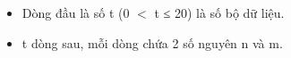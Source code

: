\begin{itemize}
	\item     Dòng đầu là số t (0 $<$ t ≤ 20) là số bộ dữ liệu.   
	\item     t dòng sau, mỗi dòng chứa 2 số nguyên n và m.   
\end{itemize}